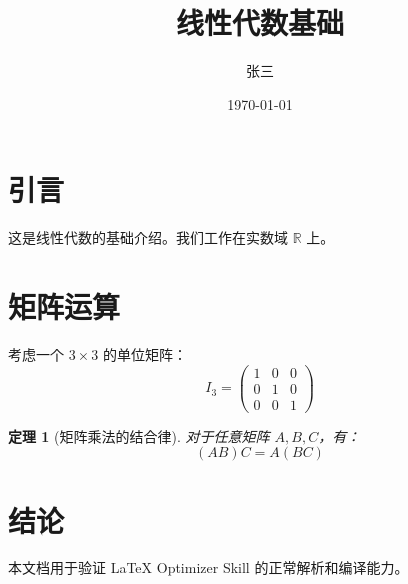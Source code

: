 \documentclass[12pt,a4paper]{article}
\title{线性代数基础}
\author{张三}
\date{\today}
\newcommand{\R}{\mathbb{R}}
\newtheorem{theorem}{定理}[section]
\begin{document}
\maketitle

\section{引言}
这是线性代数的基础介绍。我们工作在实数域 $\R$ 上。

\section{矩阵运算}
考虑一个 $3 \times 3$ 的单位矩阵：
\begin{equation}
    I_3 = \begin{pmatrix}
        1 & 0 & 0 \\
        0 & 1 & 0 \\
        0 & 0 & 1
    \end{pmatrix}
\end{equation}

\begin{theorem}[矩阵乘法的结合律]
对于任意矩阵 $A, B, C$，有：
\begin{equation}
    (AB)C = A(BC)
\end{equation}
\end{theorem}

\section{结论}
本文档用于验证 LaTeX Optimizer Skill 的正常解析和编译能力。
\end{document}
